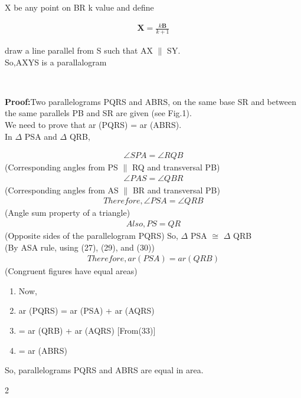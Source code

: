 \documentclass{article}
\begin{document}
\begin{multicols}{2}
\begin{flushleft}
X be any point on BR k value and define\\
\end{flushleft}
\begin{align*}
\boldsymbol{X} =\frac{
	k \boldsymbol{B}}{k+1}
\end{align*}
\begin{flushleft}
draw a line parallel from S such that AX $\parallel$ SY. \\
So,AXYS is a parallalogram
\end{flushleft}
 \\
\begin{flushleft}
\textbf{Proof:}Two parallelograms PQRS and ABRS, on
the same base SR and between the same parallels
PB and SR are given (see Fig.1).\\
We need to prove that ar (PQRS) = ar (ABRS).\\
In $\Delta$ PSA and $\Delta$ QRB,
\end{flushleft}
\begin{align}
\angle SPA = \angle RQB 
\end{align}
  \hspace{1cm}(Corresponding angles from PS $\parallel$ RQ and transversal PB) \\
\begin{align}
\angle PAS = \angle QBR
\end{align}
  \hspace{1cm} (Corresponding angles from AS $\parallel$ BR and transversal PB) \\
\begin{align}
Therefore, \angle PSA = \angle QRB
\end{align}
   \hspace{1cm} (Angle sum property of a triangle) \\
\begin{align}
Also, PS = QR
\end{align}
\hspace{0.5cm}  (Opposite sides of the parallelogram PQRS)
So, $\Delta$ PSA $\cong$ $\Delta$ QRB \\
 \hspace{0.5cm}(By ASA rule, using (27), (29), and (30))
\begin{align}
Therefore, ar (PSA) = ar (QRB) 
\end{align}
\hspace{1cm}(Congruent figures have equal areas)
\begin{enumerate}
\item[] Now, \\
\item[]ar (PQRS) = ar (PSA) + ar (AQRS)\\
\item[]= ar (QRB) + ar (AQRS) [From(33)]\\
\item[]= ar (ABRS)
\end{enumerate}
So, parallelograms PQRS and ABRS are equal in area.	  
\end{multicols}{2}
\end{document}
